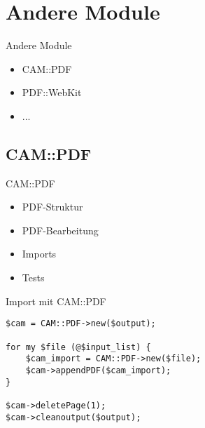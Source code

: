 


\section{Andere Module}

\begin{frame}{Andere Module}
  \begin{itemize}
  \item CAM::PDF
  \item PDF::WebKit
  \item ...
  \end{itemize}
\end{frame}

\subsection{CAM::PDF}
\begin{frame}{CAM::PDF}
  \begin{itemize}
  \item PDF-Struktur
  \item PDF-Bearbeitung
  \item Imports
  \item Tests
  \end{itemize}
\end{frame}

\begin{frame}[fragile]{Import mit CAM::PDF}
\begin{lstlisting}
$cam = CAM::PDF->new($output);
    
for my $file (@$input_list) {
    $cam_import = CAM::PDF->new($file);
    $cam->appendPDF($cam_import);
}

$cam->deletePage(1);
$cam->cleanoutput($output);
\end{lstlisting}
\end{frame}

